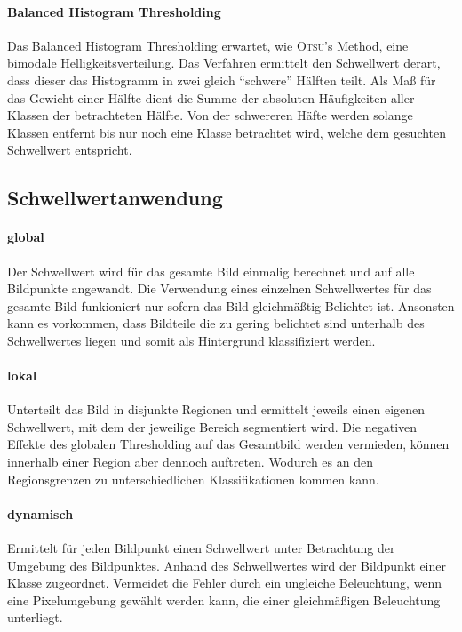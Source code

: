 \paragraph{Balanced Histogram Thresholding}
Das Balanced Histogram Thresholding erwartet, wie \textsc{Otsu}'s Method, eine bimodale Helligkeitsverteilung.
Das Verfahren ermittelt den Schwellwert derart, dass dieser das Histogramm in zwei gleich "`schwere"' Hälften teilt.
Als Maß für das Gewicht einer Hälfte dient die Summe der absoluten Häufigkeiten aller Klassen der betrachteten Hälfte.
Von der schwereren Häfte werden solange Klassen entfernt bis nur noch eine Klasse betrachtet wird, welche dem gesuchten Schwellwert entspricht.

\subsection*{Schwellwertanwendung}

\paragraph{global}
Der Schwellwert wird für das gesamte Bild einmalig berechnet und auf alle Bildpunkte angewandt.
Die Verwendung eines einzelnen Schwellwertes für das gesamte Bild funkioniert nur sofern das Bild gleichmäßtig Belichtet ist.
Ansonsten kann es vorkommen, dass Bildteile die zu gering belichtet sind unterhalb des Schwellwertes liegen und somit als Hintergrund klassifiziert werden.

\paragraph{lokal}
Unterteilt das Bild in disjunkte Regionen und ermittelt jeweils einen eigenen Schwellwert, mit dem der jeweilige Bereich segmentiert wird.
Die negativen Effekte des globalen Thresholding auf das Gesamtbild werden vermieden, können innerhalb einer Region aber dennoch auftreten.
Wodurch es an den Regionsgrenzen zu unterschiedlichen Klassifikationen kommen kann.

\paragraph{dynamisch}
Ermittelt für jeden Bildpunkt einen Schwellwert unter Betrachtung der Umgebung des Bildpunktes.
Anhand des Schwellwertes wird der Bildpunkt einer Klasse zugeordnet.
Vermeidet die Fehler durch ein ungleiche Beleuchtung, wenn eine Pixelumgebung gewählt werden kann, die einer gleichmäßigen Beleuchtung unterliegt.

